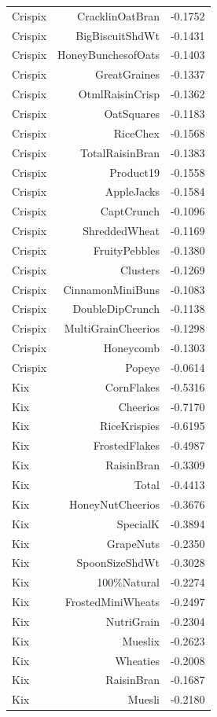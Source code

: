 \begin{longtable}{@{}lrr@{}}
Crispix & CracklinOatBran & -0.1752 \\
Crispix & BigBiscuitShdWt & -0.1431 \\
Crispix & HoneyBunchesofOats & -0.1403 \\
Crispix & GreatGraines & -0.1337 \\
Crispix & OtmlRaisinCrisp & -0.1362 \\
Crispix & OatSquares & -0.1183 \\
Crispix & RiceChex & -0.1568 \\
Crispix & TotalRaisinBran & -0.1383 \\
Crispix & Product19 & -0.1558 \\
Crispix & AppleJacks & -0.1584 \\
Crispix & CaptCrunch & -0.1096 \\
Crispix & ShreddedWheat & -0.1169 \\
Crispix & FruityPebbles & -0.1380 \\
Crispix & Clusters & -0.1269 \\
Crispix & CinnamonMiniBuns & -0.1083 \\
Crispix & DoubleDipCrunch & -0.1138 \\
Crispix & MultiGrainCheerios & -0.1298 \\
Crispix & Honeycomb & -0.1303 \\
Crispix & Popeye & -0.0614 \\
Kix & CornFlakes & -0.5316 \\
Kix & Cheerios & -0.7170 \\
Kix & RiceKrispies & -0.6195 \\
Kix & FrostedFlakes & -0.4987 \\
Kix & RaisinBran & -0.3309 \\
Kix & Total & -0.4413 \\
Kix & HoneyNutCheerios & -0.3676 \\
Kix & SpecialK & -0.3894 \\
Kix & GrapeNuts & -0.2350 \\
Kix & SpoonSizeShdWt & -0.3028 \\
Kix & 100\%Natural & -0.2274 \\
Kix & FrostedMiniWheats & -0.2497 \\
Kix & NutriGrain & -0.2304 \\
Kix & Mueslix & -0.2623 \\
Kix & Wheaties & -0.2008 \\
Kix & RaisinBran & -0.1687 \\
Kix & Muesli & -0.2180 \\

\end{longtable}

